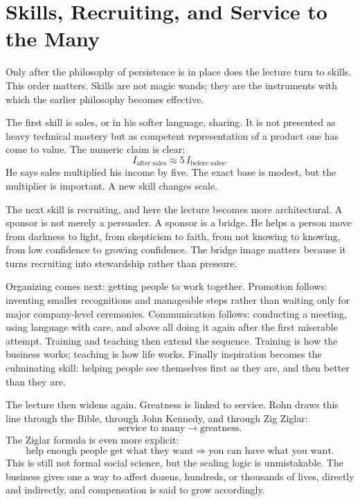 \section{Skills, Recruiting, and Service to the Many}

Only after the philosophy of persistence is in place does the lecture turn to skills. This order matters. Skills are not magic wands; they are the instruments with which the earlier philosophy becomes effective.

The first skill is sales, or in his softer language, sharing. It is not presented as heavy technical mastery but as competent representation of a product one has come to value. The numeric claim is clear:
\begin{equation}
I_{\text{after sales}} \approx 5\,I_{\text{before sales}}.
\end{equation}
He says sales multiplied his income by five. The exact base is modest, but the multiplier is important. A new skill changes scale.

The next skill is recruiting, and here the lecture becomes more architectural. A sponsor is not merely a persuader. A sponsor is a bridge. He helps a person move from darkness to light, from skepticism to faith, from not knowing to knowing, from low confidence to growing confidence. The bridge image matters because it turns recruiting into stewardship rather than pressure.

Organizing comes next: getting people to work together. Promotion follows: inventing smaller recognitions and manageable steps rather than waiting only for major company-level ceremonies. Communication follows: conducting a meeting, using language with care, and above all doing it again after the first miserable attempt. Training and teaching then extend the sequence. Training is how the business works; teaching is how life works. Finally inspiration becomes the culminating skill: helping people see themselves first as they are, and then better than they are.

The lecture then widens again. Greatness is linked to service. Rohn draws this line through the Bible, through John Kennedy, and through Zig Ziglar:
\begin{equation}
\text{service to many} \longrightarrow \text{greatness}.
\end{equation}
The Ziglar formula is even more explicit:
\begin{equation}
\text{help enough people get what they want}
\Longrightarrow
\text{you can have what you want}.
\end{equation}
This is still not formal social science, but the scaling logic is unmistakable. The business gives one a way to affect dozens, hundreds, or thousands of lives, directly and indirectly, and compensation is said to grow accordingly.

